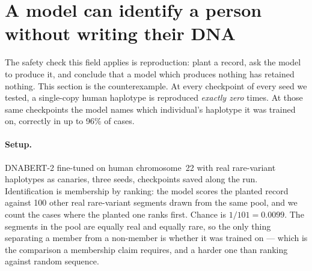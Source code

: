 \section{A model can identify a person without writing their DNA}
\label{sec:ident}

The safety check this field applies is reproduction: plant a record, ask the model to produce it,
and conclude that a model which produces nothing has retained nothing. This section is the
counterexample. At every checkpoint of every seed we tested, a single-copy human haplotype is
reproduced \emph{exactly zero} times. At those same checkpoints the model names which individual's
haplotype it was trained on, correctly in up to 96\% of cases.

\paragraph{Setup.}
DNABERT-2 fine-tuned on human chromosome~22 with real rare-variant haplotypes as canaries, three
seeds, checkpoints saved along the run. Identification is membership by ranking: the model scores
the planted record against 100 other real rare-variant segments drawn from the same pool, and we
count the cases where the planted one ranks first. Chance is $1/101 = 0.0099$. The segments in the
pool are equally real and equally rare, so the only thing separating a member from a non-member is
whether it was trained on --- which is the comparison a membership claim requires, and a harder one
than ranking against random sequence.

